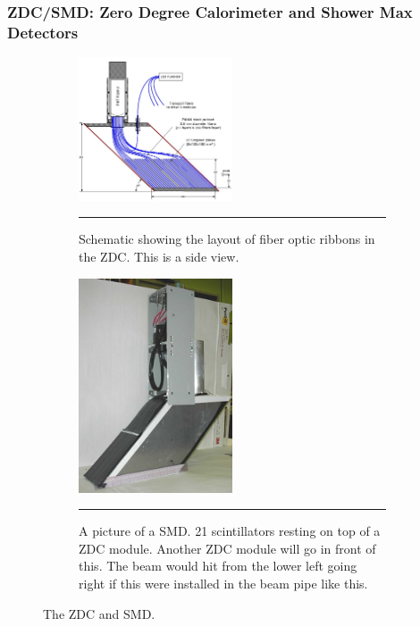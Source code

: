 \subsubsection{ZDC/SMD: Zero Degree Calorimeter and Shower Max Detectors}
\label{sect:ZDC}

\begin{figure}

\begin{subfigure}[p]{1\textwidth}
  \centering
    \includegraphics[width=0.5\textwidth]{Figures/ZDCschematic.JPG}

  \caption[Schematic showing the layout of fiber optics in the ZDC]{Schematic showing the layout of fiber optic ribbons in the ZDC. This is a side view.}
  \label{fig:zdcschem}
   \rule{35em}{0.7pt}
\end{subfigure}
\begin{subfigure}[p]{1\textwidth}
  \centering
    \includegraphics[width=0.5\textwidth]{Figures/SMDonZDC.jpg}

  \caption[Picture of the SMD.]{A picture of a SMD. 21 scintillators resting on top of a ZDC module. Another ZDC module will go in front of this. The beam would hit from the lower left going right if this were installed in the beam pipe like this.}
  \label{fig:smdonzdc}
   \rule{35em}{0.7pt}
\end{subfigure}
\caption{The ZDC and SMD.}
\end{figure}

